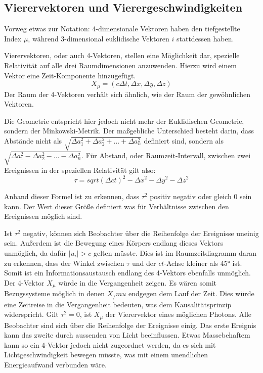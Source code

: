 \documentclass[12pt]{article}
\begin{document}
\subsection{Vierervektoren und Vierergeschwindigkeiten}

\label{4v}
Vorweg etwas zur Notation: 4-dimensionale Vektoren haben den tiefgestellte Index $\mu$, während 3-dimensional euklidische Vektoren $i$ stattdessen haben.

Vierervektoren, oder auch 4-Vektoren, stellen eine Möglichkeit dar, spezielle Relativität auf alle drei Raumdimensionen anzuwenden.
Hierzu wird einem Vektor eine Zeit-Komponente hinzugefügt.
\begin{equation}
X_\mu = (c\Delta t, \Delta x, \Delta y, \Delta z)
\end{equation}
Der Raum der 4-Vektoren verhält sich ähnlich, wie der Raum der gewöhnlichen Vektoren.

Die Geometrie entspricht hier jedoch nicht mehr der Euklidischen Geometrie, sondern der Minkowski-Metrik.
Der maßgebliche Unterschied besteht darin, dass Abstände nicht als $\sqrt{\Delta a_1^2 + \Delta a_2^2 + ... + \Delta a_n^2}$ definiert sind, sondern als $\sqrt{\Delta a_1^2 - \Delta a_2^2 - ... - \Delta a_n^2}$.
Für Abstand, oder Raumzeit-Intervall, zwischen zwei Ereignissen in der speziellen Relativität gilt also:
\begin{equation}
	\tau = sqrt{(\Delta ct)^2 - {\Delta x}^2 - {\Delta y}^2 - {\Delta z}^2}
\end{equation}

Anhand dieser Formel ist zu erkennen, dass $\tau^2$ positiv negativ oder gleich 0 sein kann.
Der Wert dieser Größe definiert was für Verhältnisse zwischen den Ereignissen möglich sind.

Ist $\tau^2$ negativ, können sich Beobachter über die Reihenfolge der Ereignisse uneinig sein.
Außerdem ist die Bewegung eines Körpers endlang dieses Vektors unmöglich, da dafür $|u_i| > c$ gelten müsste.
Dies ist im Raumzeitdiagramm daran zu erkennen, dass der Winkel zwischen $\tau$ und der $ct$-Achse kleiner als \ang{45} ist.
Somit ist ein Informationsaustausch endlang des 4-Vektors ebenfalls unmöglich.
Der 4-Vektor $X_\mu$ würde in die Vergangenheit zeigen.
Es wären somit Bezugssysteme möglich in denen $X_/mu$ endgegen dem Lauf der Zeit.
Dies würde eine Zeitreise in die Vergangenheit bedeuten, was dem Kausalitätsprinzip widerspricht.
Gilt $\tau^2 = 0$, ist $X_\mu$ der Vierervektor eines möglichen Photons.
Alle Beobachter sind sich über die Reihenfolge der Ereignisse einig.
Das erste Ereignis kann das zweite durch aussenden von Licht beeinflussen.
Etwas Massebehaftem kann so ein 4-Vektor jedoch nicht zugeordnet werden, da es sich mit Lichtgeschwindigkeit bewegen müsste, was mit einem unendlichen Energieaufwand verbunden wäre.
\end{document}
